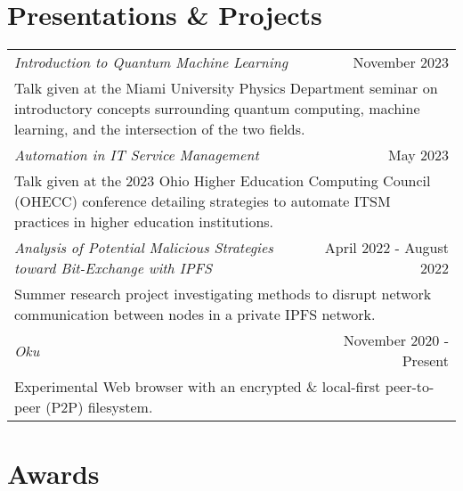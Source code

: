 \documentclass[letterpaper,8pt]{article} %
\begin{document}
\section{Presentations \& Projects}

\begin{tabular*}{\linewidth}{@{\extracolsep{\fill}} lr }
\emph{Introduction to Quantum Machine Learning} & November 2023\\
\multicolumn{2}{p{\linewidth}}{Talk given at the Miami University Physics Department seminar on introductory concepts surrounding quantum computing, machine learning, and the intersection of the two fields.}\\
\emph{Automation in IT Service Management} & May 2023\\
\multicolumn{2}{p{\linewidth}}{Talk given at the 2023 Ohio Higher Education Computing Council (OHECC) conference detailing strategies to automate ITSM practices in higher education institutions.}\\
\emph{Analysis of Potential Malicious Strategies toward Bit-Exchange with IPFS} & April 2022 - August 2022\\
\multicolumn{2}{p{\linewidth}}{Summer research project investigating methods to disrupt network communication between nodes in a private IPFS network.}\\
\emph{Oku} & November 2020 - Present\\
\multicolumn{2}{p{\linewidth}}{Experimental Web browser with an encrypted \& local-first peer-to-peer (P2P) filesystem.}\\
\end{tabular*}


\section{Awards}
\end{document}
